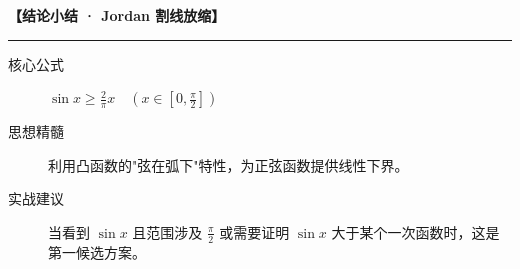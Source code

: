 \begin{summarybox}
\textbf{【结论小结 · Jordan 割线放缩】}
\vspace{0.8em}
\hrule
\vspace{0.8em}

\begin{description}
    \item[核心公式] $\sin x \geqslant \frac{2}{\pi}x \quad (x \in [0, \frac{\pi}{2}])$
    \item[思想精髓] 利用凸函数的"弦在弧下"特性，为正弦函数提供线性下界。
    \item[实战建议] 当看到 $\sin x$ 且范围涉及 $\frac{\pi}{2}$ 或需要证明 $\sin x$ 大于某个一次函数时，这是第一候选方案。
\end{description}
\end{summarybox}
